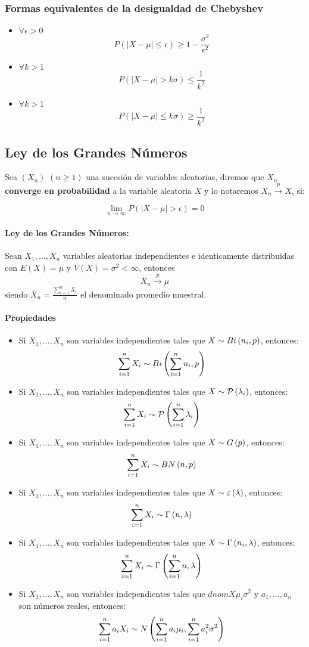 \subsubsection{Formas equivalentes de la desigualdad de Chebyshev}
\begin{itemize}
	\item $\forall \epsilon > 0$  $$P(|X-\mu| \leq \epsilon) \geq 1 - \frac{\sigma^2}{\epsilon^2}$$
	\item $\forall k > 1$  $$P(|X-\mu| > k\sigma) \leq \frac{1}{k^2}$$
	\item $\forall k > 1$  $$P(|X-\mu| \leq k\sigma) \geq \frac{1}{k^2}$$
\end{itemize}

\subsection{Ley de los Grandes Números}
Sea $(X_n)$ $(n\geq 1)$ una sucesión de variables aleatorias, diremos que  $X_n$ \textbf{converge en probabilidad} a la variable aleatoria $X$ y lo notaremos $X_n \overset{p}{\longrightarrow} X$, si:

$$\lim_{n\to\infty}P(|X-\mu| > \epsilon) = 0$$

\paragraph{Ley de los Grandes Números:} Sean $X_1,\dots,X_n$ variables aleatorias independientes e identicamente distribuidas con $E(X) = \mu$ y $V(X) = \sigma^2 < \infty$, entonces
$$\bar{X}_n\overset{p}{\longrightarrow} \mu$$
siendo $\bar{X}_n = \frac{\sum_{i=1}^{n}X_i}{n}$ el denominado promedio muestral.

\paragraph{Propiedades}
\begin{itemize}
	\item Si $X_1,\dots,X_n$ son variables independientes tales que $X\sim Bi\left(n_i,p\right)$, entonces:
	$$\sum_{i=1}^{n}X_i\sim Bi\left(\sum_{i=1}^{n}n_i,p\right)$$
	\item Si $X_1,\dots,X_n$ son variables independientes tales que $X\sim \mathcal{P}\left( \lambda_i\right)$, entonces:
	$$\sum_{i=1}^{n}X_i\sim \mathcal{P}\left(\sum_{i=1}^{n}\lambda_i\right)$$
	\item Si $X_1,\dots,X_n$ son variables independientes tales que $X\sim G\left(p\right)$, entonces:
	$$\sum_{i=1}^{n}X_i\sim BN\left(n,p\right)$$
	\item Si $X_1,\dots,X_n$ son variables independientes tales que $X\sim \varepsilon\left(\lambda\right)$, entonces:
	$$\sum_{i=1}^{n}X_i\sim \Gamma\left(n,\lambda\right)$$
	\item Si $X_1,\dots,X_n$ son variables independientes tales que $X\sim \Gamma\left(n_i,\lambda\right)$, entonces:
	$$\sum_{i=1}^{n}X_i\sim \Gamma\left(\sum_{i=1}^{n}n,\lambda\right)$$
	\item Si $X_1,\dots,X_n$ son variables independientes tales que $dnom{X}{\mu_i}{\sigma^2}$ y $a_1,\dots,a_n$ son números reales, entonces:
	$$\sum_{i=1}^{n}a_iX_i\sim N\left(\sum_{i=1}^{n}a_i\mu_i,\sum_{i=1}^{n}a_i^2\sigma^2\right)$$
\end{itemize}
